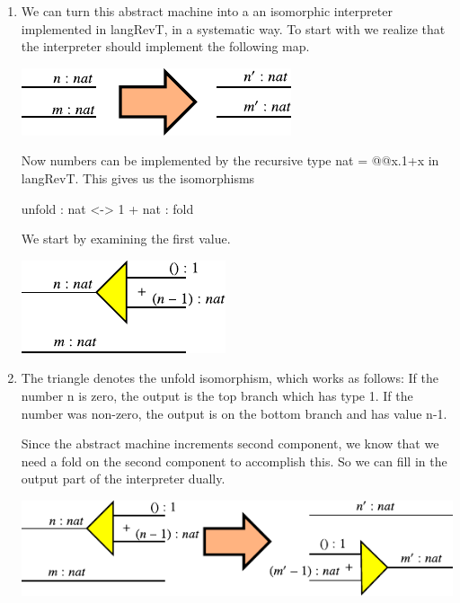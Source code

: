 \documentclass{llncs}
\begin{document}
\begin{enumerate}
\item 
We can turn this abstract machine into a an isomorphic interpreter
implemented in {{langRevT}}, in a systematic way. To start with we
realize that the interpreter should implement the following map.

\begin{center}
  \includegraphics{diagrams/nat-nat1.pdf}
\end{center}

Now numbers can be implemented by the recursive type {{nat = @@x.1+x}}
in {{langRevT}}. This gives us the isomorphisms 

\begin{center}
  {{unfold : nat <-> 1 + nat : fold}}
\end{center}

We start by examining the first value. 

\begin{center}
  \includegraphics{diagrams/nat-nat2.pdf}
\end{center}

\item
The triangle denotes the {{unfold}} isomorphism, which works as
follows: If the number {{n}} is zero, the output is the top branch
which has type {{1}}. If the number was non-zero, the output is on the
bottom branch and has value {{n-1}}. 

Since the abstract machine increments second component, we know that
we need a {{fold}} on the second component to accomplish this. So we
can fill in the output part of the interpreter dually. 

\begin{center}
  \includegraphics{diagrams/nat-nat3.pdf}
\end{center}


\end{enumerate}
\end{document}
